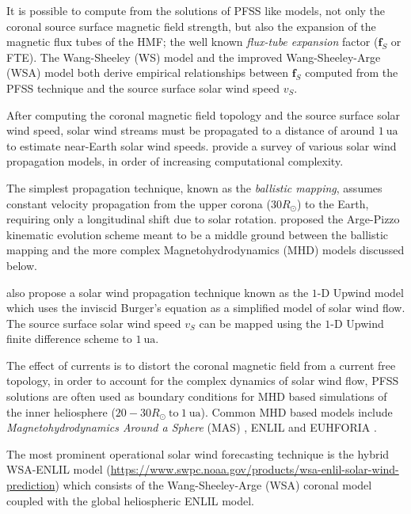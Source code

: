 It is possible to compute from the solutions of PFSS like models, not only the coronal source 
surface magnetic field strength, but also the expansion of the magnetic flux tubes of the HMF; 
the well known \emph{flux-tube expansion} factor ($\mathbf{f}_S$ or FTE). The Wang-Sheeley (WS) 
model \citep{WSAModel} and the improved Wang-Sheeley-Arge (WSA) model 
\citep{arge2000improvement,arge2004stream} both derive empirical relationships between 
$\mathbf{f}_S$ computed from the PFSS technique and the source surface solar wind speed $v_S$.  

After computing the coronal magnetic field topology and the source surface solar wind speed, 
solar wind streams must be propagated to a distance of around $\SI{1}{\astronomicalunit}$ to 
estimate near-Earth solar wind speeds. \citet{Riley2011} provide a survey of various solar wind 
propagation models, in order of increasing computational complexity. 

The simplest propagation technique, known as the \emph{ballistic mapping}, assumes constant 
velocity propagation from the upper corona ($30R_{\odot}$) to the Earth, requiring only a 
longitudinal shift due to solar rotation. \citet{arge2000improvement} proposed the Arge-Pizzo 
kinematic evolution scheme meant to be a middle ground between the ballistic mapping and the more 
complex Magnetohydrodynamics (MHD) models discussed below.

\citet{Riley2011} also propose a solar wind propagation technique known as the 
$1\textrm{-}\text{D}$ Upwind model which uses the inviscid Burger's equation as a simplified model 
of solar wind flow. The source surface solar wind speed $v_S$ can be mapped using the 
$1\textrm{-}\text{D}$ Upwind finite difference scheme to $\SI{1}{\astronomicalunit}$.

The effect of currents is to distort the coronal magnetic field from a current free topology, 
in order to account for the complex dynamics of solar wind flow, PFSS solutions are often used as 
boundary conditions for MHD based simulations of the inner heliosphere 
($20-30 R_{\odot} \ \mathrm{to} \ \SI{1}{\astronomicalunit}$). Common MHD based models include 
\emph{Magnetohydrodynamics Around a Sphere} (MAS) \citep{linker1999magnetohydrodynamic}, ENLIL 
\citep{ODSTRCIL1996,ODSTRCIL1999a,ODSTRCIL1999b,ODSTRCIL2003,ODSTRCIL2004} and EUHFORIA 
\citep{pomoell2018euhforia}. 

The most prominent operational solar wind forecasting technique is the hybrid WSA-ENLIL model 
(\url{https://www.swpc.noaa.gov/products/wsa-enlil-solar-wind-prediction}) which consists of the 
Wang-Sheeley-Arge (WSA) coronal model coupled with the global heliospheric ENLIL model. 

